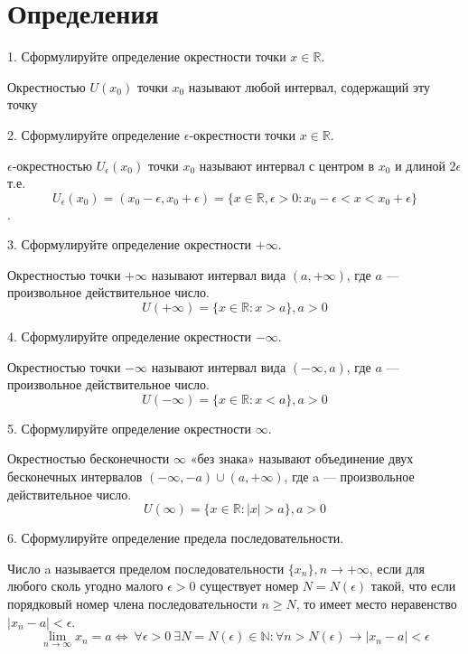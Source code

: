 \documentclass[a4paper, 10pt]{article}
\begin{document}
\section{Определения}
    \begin{bf}1. Сформулируйте определение окрестности точки $x \in \mathbb{R}$.\end{bf}

    Окрестностью $U(x_0)$ точки $x_0$ называют любой интервал, содержащий эту точку

    \begin{bf}2. Сформулируйте определение $\epsilon$-окрестности точки $x \in \mathbb{R}$. \end{bf}

    $\epsilon$-окрестностью $U_\epsilon(x_0)$ точки $x_0$ называют интервал с центром в 
    $x_0$ и длиной $2\epsilon$ т.е. $$U_\epsilon(x_0) = (x_0 - \epsilon, x_0 + \epsilon) = 
    \{x \in \mathbb{R},  \epsilon>0 : x_0 - \epsilon < x < x_0 + \epsilon\}$$.

    \begin{bf}3. Сформулируйте определение окрестности $+\infty$. \end{bf}

    Окрестностью точки $+\infty$ называют интервал вида $(a, +\infty)$, где $a$ — произвольное действительное число.
    $$U(+\infty) = \{x \in \mathbb{R}: x > a\}, a > 0$$

    \begin{bf}4. Сформулируйте определение окрестности $-\infty$. \end{bf}

    Окрестностью точки $-\infty$ называют интервал вида $(-\infty, a)$, где $a$ — произвольное действительное число.
    $$U(-\infty) = \{x \in \mathbb{R}: x < a\}, a > 0$$

    \begin{bf}5. Сформулируйте определение окрестности $\infty$. \end{bf}

    Окрестностью бесконечности $\infty$ «без знака»  называют объединение двух бесконечных интервалов 
    $(-\infty, -a) \cup (a, +\infty)$, где a — произвольное действительное число.
    $$U(\infty) = \{x \in \mathbb{R}: |x| > a\}, a > 0$$

    \begin{bf}6. Сформулируйте определение предела последовательности.\end{bf}
    
    Число a называется пределом последовательности $\{x_n\}, n \to +\infty$, если для любого 
    сколь угодно малого $\epsilon > 0$ существует номер $N = N(\epsilon)$ такой, что 
    если порядковый номер члена последовательности $n  \geqslant  N$, то имеет место неравенство 
    $|x_n - a| < \epsilon$. 
    $$\lim\limits_{n \to \infty} x_n = a \iff \ \forall \epsilon > 0 \  \exists N = N(\epsilon) \in 
    \mathbb{N} : \forall n > N(\epsilon) \longrightarrow |x_n - a| < \epsilon$$
    
\end{document}
